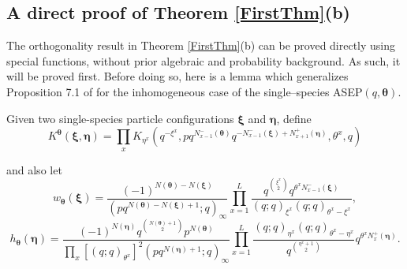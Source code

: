 \documentclass{ximera}
\begin{document}
\subsection{A direct proof of Theorem \ref{FirstThm}(b)}
The orthogonality result in Theorem \ref{FirstThm}(b) can be proved directly using special functions, without prior algebraic and probability background. As such, it will be proved first. Before doing so, here is a lemma which generalizes Proposition 7.1 of \cite{CFG21} for the inhomogeneous case of the single--species ASEP$(q,\boldsymbol{\theta})$.

Given two single-species particle configurations $\boldsymbol{\xi}$ and $\boldsymbol{\eta}$, define 
\begin{equation*}
    K^{\boldsymbol\theta}(\boldsymbol\xi,\boldsymbol\eta)=\prod_{x}K_{\eta^x}\left(q^{-\xi^x},pq^{N_{x-1}^-(\boldsymbol\theta)}q^{-N_{x-1}^-(\boldsymbol\xi)+N_{x+1}^+(\boldsymbol\eta)},\theta^x,q\right)
\end{equation*}

and also let 
\begin{equation*}
    w_{\boldsymbol\theta}(\boldsymbol\xi)=\frac{(-1)^{N(\boldsymbol\theta)-N(\boldsymbol\xi)}}{\left(pq^{N(\boldsymbol\theta)-N(\boldsymbol\xi)+1};q\right)_\infty }\prod_{x=1}^L\frac{q^{\binom{\xi^x}{2}}q^{\theta^x N_{x-1}^-(\boldsymbol\xi)}}{(q;q)_{\xi^x}(q;q)_{\theta^x-\xi^x}},
\end{equation*}
\begin{equation*}
    h_{\boldsymbol\theta}(\boldsymbol\eta)=\frac{(-1)^{N(\boldsymbol\eta)}q^{\binom{N(\boldsymbol\theta)+1}{2}}p^{N(\boldsymbol\theta)}}{\prod_x[(q;q)_{\theta^x}]^{2} \left(pq^{N(\boldsymbol\eta)+1};q\right)_\infty} \prod_{x=1}^L\frac{(q;q)_{\eta^x}(q;q)_{\theta^x-\eta^x}}{q^{\binom{\eta^x+1}{2}}}q^{\theta^x N_{x}^+(\boldsymbol\eta)}.
\end{equation*}
\end{document}
